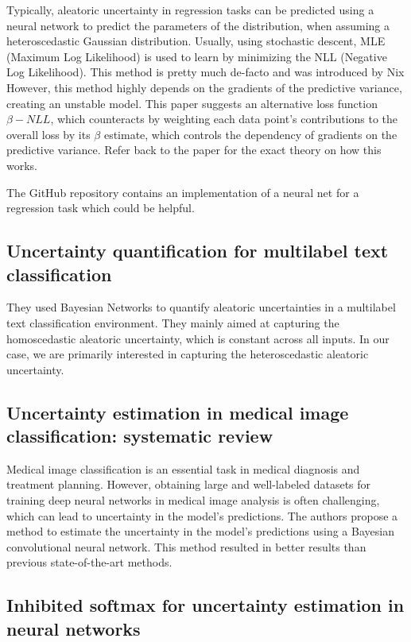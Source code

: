 \documentclass[10pt]{article}
\begin{document}
Typically, aleatoric uncertainty in regression tasks can be predicted using a neural network to predict the parameters of the distribution, 
when assuming a heteroscedastic Gaussian distribution.
Usually, using stochastic descent, MLE (Maximum Log Likelihood) is used to learn by minimizing the NLL (Negative Log Likelihood).
This method is pretty much de-facto and was introduced by Nix\cite{nix1994estimating}
However, this method highly depends on the gradients of the predictive variance, creating an unstable model.
This paper suggests an alternative loss function $\beta-NLL$, which counteracts by weighting each data point's contributions to the overall loss by its $\beta$ estimate, 
which controls the dependency of gradients on the predictive variance. Refer back to the paper for the exact theory on how this works.

The GitHub repository contains an implementation of a neural net for a regression task which could be helpful.

\subsection*{Uncertainty quantification for multilabel text classification \cite{chen2020uncertainty}}
They used Bayesian Networks to quantify aleatoric uncertainties in a multilabel text classification environment.
They mainly aimed at capturing the homoscedastic aleatoric uncertainty, which is constant across all inputs. In our case, we are primarily interested in capturing the heteroscedastic aleatoric uncertainty.

\subsection*{Uncertainty estimation in medical image classification: systematic review \cite{kurz2022uncertainty}}
Medical image classification is an essential task in medical diagnosis and treatment planning. However, obtaining large and well-labeled datasets for training deep neural networks in medical image analysis is often challenging, which can lead to uncertainty in the model's predictions. The authors propose a method to estimate the uncertainty in the model's predictions using a Bayesian convolutional neural network. This method resulted in better results than previous state-of-the-art methods.



\subsection*{Inhibited softmax for uncertainty estimation in neural networks \cite{mozejko2018inhibited}}
\end{document}
